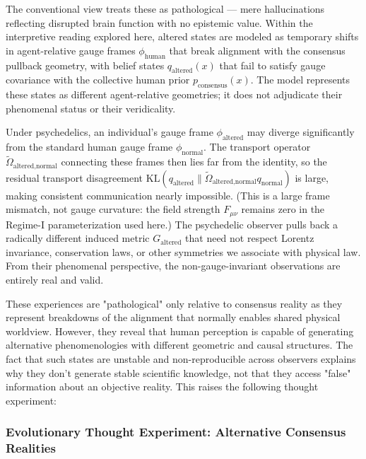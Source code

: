 \documentclass[11pt]{article}
\begin{document}
The conventional view treats these as pathological — mere hallucinations reflecting disrupted brain function with no epistemic value. Within the interpretive reading explored here, altered states are modeled as temporary shifts in agent-relative gauge frames $\phi_{\text{human}}$ that break alignment with the consensus pullback geometry, with belief states $q_{\text{altered}}(x)$ that fail to satisfy gauge covariance with the collective human prior $p_{\text{consensus}}(x)$. The model represents these states as different agent-relative geometries; it does not adjudicate their phenomenal status or their veridicality.

Under psychedelics, an individual's gauge frame $\phi_{\text{altered}}$ may diverge significantly from the standard human gauge frame $\phi_{\text{normal}}$. The transport operator $\tilde{\Omega}_{\text{altered,normal}}$ connecting these frames then lies far from the identity, so the residual transport disagreement $\mathrm{KL}(q_{\text{altered}} \| \tilde{\Omega}_{\text{altered,normal}} q_{\text{normal}})$ is large, making consistent communication nearly impossible. (This is a large frame mismatch, not gauge curvature: the field strength $F_{\mu\nu}$ remains zero in the Regime-I parameterization used here.) The psychedelic observer pulls back a radically different induced metric $G_{\text{altered}}$ that need not respect Lorentz invariance, conservation laws, or other symmetries we associate with physical law. From their phenomenal perspective, the non-gauge-invariant observations are entirely real and valid.

These experiences are "pathological" only relative to consensus reality as they represent breakdowns of the alignment that normally enables shared physical worldview. However, they reveal that human perception is capable of generating alternative phenomenologies with different geometric and causal structures. The fact that such states are unstable and non-reproducible across observers explains why they don't generate stable scientific knowledge, not that they access "false" information about an objective reality.  This raises the following thought experiment:

\subsubsection{Evolutionary Thought Experiment: Alternative Consensus Realities}
\end{document}

